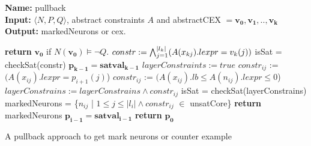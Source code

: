 \begin{algorithm}[t]
    \textbf{Name: } pullback \\
    \textbf{Input: } $\langle N,P,Q \rangle$, abstract constraints $A$ and abstractCEX $=\boldsymbol{v_0}, \boldsymbol{v_1}, .., \boldsymbol{v_k}$ \\
    \textbf{Output: } markedNeurons or cex. 
    \begin{algorithmic}[1]
     \State \textbf{return} $\boldsymbol{v_0}$ if $N(\boldsymbol{v_0}) \models \neg Q$. 
     \State $constr := \bigwedge_{j=1}^{|l_k|} (A(x_{kj}).lexpr = v_k(j))$
     \State isSat = checkSat(constr)
      
        \State $\boldsymbol{p_{k-1}} = \boldsymbol{satval_{k-1}}$ 
     \EndIf
          \State $layerConstraints := true$
              \State $constr_{ij}$ := $(A(x_{ij}).lexpr = p_{i+1}(j)$) 
            \Else
              \State $constr_{ij}$ := $(A(x_{ij}).lb \leq A(n_{ij}).lexpr \leq 0$)
            \EndIf
            \State $layerConstrains := layerConstrains \land constr_{ij}$
          \EndFor
          \State isSat = checkSat(layerConstrains)
            \State markedNeurons = \{$n_{ij}$ | $1 \leq j\leq |l_i| \land constr_{ij}$ $\in$ unsatCore\}
            \State \textbf{return } markedNeurons
          \Else
            \State $\boldsymbol{p_{i-1}} = \boldsymbol{satval_{i-1}}$
          \EndIf
        \EndIf
     \EndFor
      \State \textbf{return} $\boldsymbol{p_0}$ 
    \end{algorithmic}
    \caption{A pullback approach to get mark neurons or counter example}
    \label{algo:refine1}
  \end{algorithm}